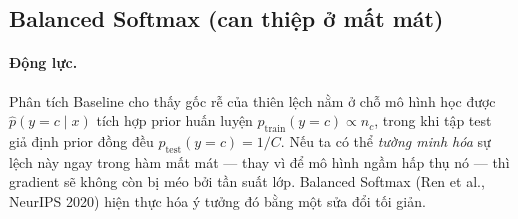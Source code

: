

\subsection{Balanced Softmax (can thiệp ở mất mát)}

\paragraph{Động lực.}
Phân tích Baseline cho thấy gốc rễ của thiên lệch nằm ở chỗ mô hình học được
$\hat{p}(y=c \mid x)$ tích hợp prior huấn luyện $p_{\text{train}}(y=c) \propto n_c$,
trong khi tập test giả định prior đồng đều $p_{\text{test}}(y=c) = 1/C$.
Nếu ta có thể \emph{tường minh hóa} sự lệch này ngay trong hàm mất mát --- thay vì
để mô hình ngầm hấp thụ nó --- thì gradient sẽ không còn bị méo bởi tần suất lớp.
Balanced Softmax \cite{ren2020balanced} (Ren et al., NeurIPS 2020) hiện thực hóa
ý tưởng đó bằng một sửa đổi tối giản.

